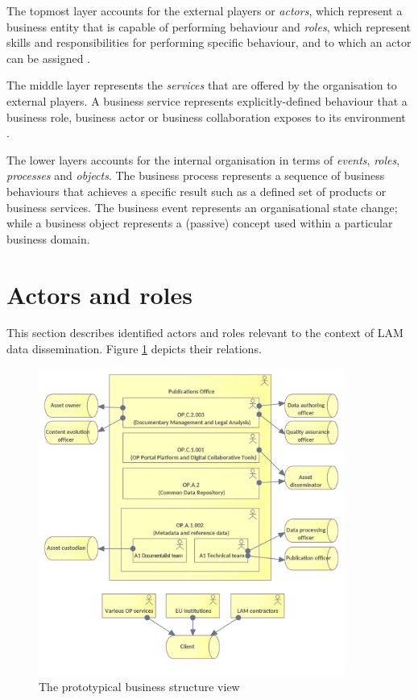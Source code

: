 	The topmost layer accounts for the external players or \textit{actors}, which represent a business entity that is capable of performing behaviour and \textit{roles}, which represent skills and responsibilities for performing specific behaviour, and to which an actor can be assigned \citep{archimate3.1}. 
	
	The middle layer represents the \textit{services} that are offered by the organisation to external players. A business service represents explicitly-defined behaviour that a business role, business actor or business collaboration exposes to its environment \citep{archimate3.1}.
	
	The lower layers accounts for the internal organisation in terms of \textit{events}, \textit{roles}, \textit{processes} and \textit{objects}. The business process represents a sequence of business behaviours that achieves a specific result such as a defined set of products or business services. The business event represents an organisational state change; while a business object represents a (passive) concept used within a particular business domain.
	
	
	\section{Actors and roles}
	\label{sec:actors-roles}
	
	This section describes identified actors and roles relevant to the context of LAM data dissemination. Figure \ref{fig:organisation-structure} depicts their relations.
	
	\begin{figure}[!h]
		\centering
		\includegraphics[width=0.895\textwidth]{images/business/Organisation.png}
		\caption{The prototypical business structure view}
		\label{fig:organisation-structure}
	\end{figure} 
	
